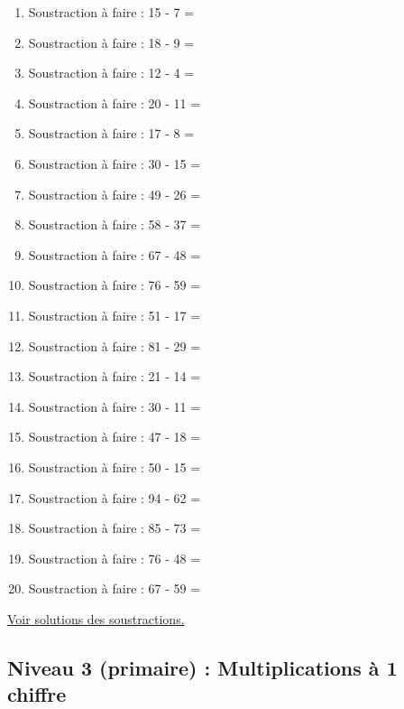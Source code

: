 \documentclass[11pt]{article}
\begin{document}
\begin{enumerate}
\item Soustraction à faire :  15 - 7 =
\item Soustraction à faire :  18 - 9 =
\item Soustraction à faire :  12 - 4 =
\item Soustraction à faire :  20 - 11 =
\item Soustraction à faire :  17 - 8 =
\item Soustraction à faire :  30 - 15 =
\item Soustraction à faire :  49 - 26 =
\item Soustraction à faire :  58 - 37 =
\item Soustraction à faire :  67 - 48 =
\item Soustraction à faire :  76 - 59 =
\item Soustraction à faire :  51 - 17 =
\item Soustraction à faire :  81 - 29 =
\item Soustraction à faire :  21 - 14 =
\item Soustraction à faire :  30 - 11 =
\item Soustraction à faire :  47 - 18 =
\item Soustraction à faire :  50 - 15 =
\item Soustraction à faire :  94 - 62 =
\item Soustraction à faire :  85 - 73 =
\item Soustraction à faire :  76 - 48 =
\item Soustraction à faire :  67 - 59 =
\end{enumerate}




\hyperref[org80ff65c]{Voir solutions des soustractions.}




\newpage


\subsection{Niveau 3 (primaire) : Multiplications à 1 chiffre}
\label{sec:org21fd668}
\label{org3d332d1}
\end{document}

